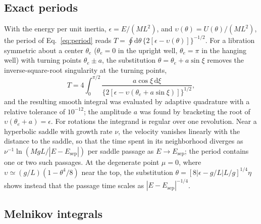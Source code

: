 \subsection{Exact periods}

With the energy per unit inertia, $\epsilon=E/(ML^{2})$, and $\upsilon(\theta)=U(\theta)/(ML^{2})$, the period of Eq.~\eqref{eq:period} reads $T=\oint\mathrm d\theta\,\{2[\epsilon-\upsilon(\theta)]\}^{-1/2}$. For a libration symmetric about a center $\theta_e$ ($\theta_e=0$ in the upright well, $\theta_e=\pi$ in the hanging well) with turning points $\theta_e\pm a$, the substitution $\theta=\theta_e+a\sin\xi$ removes the inverse-square-root singularity at the turning points,
\begin{equation}
T = 4\int_0^{\pi/2}\frac{a\cos\xi\,\mathrm d\xi}{\{2[\epsilon-\upsilon(\theta_e+a\sin\xi)]\}^{1/2}},
\end{equation}
and the resulting smooth integral was evaluated by adaptive quadrature with a relative tolerance of $10^{-12}$; the amplitude $a$ was found by bracketing the root of $\upsilon(\theta_e+a)=\epsilon$. For rotations the integrand is regular over one revolution. Near a hyperbolic saddle with growth rate $\nu$, the velocity vanishes linearly with the distance to the saddle, so that the time spent in its neighborhood diverges as $\nu^{-1}\ln(MgL/|E-E_{\mathrm{sep}}|)$ per saddle passage as $E\to E_{\mathrm{sep}}$; the period contains one or two such passages. At the degenerate point $\mu=0$, where $\upsilon\simeq(g/L)(1-\theta^{4}/8)$ near the top, the substitution $\theta=[8|\epsilon-g/L|L/g]^{1/4}\eta$ shows instead that the passage time scales as $|E-E_{\mathrm{sep}}|^{-1/4}$.

\subsection{Melnikov integrals}

